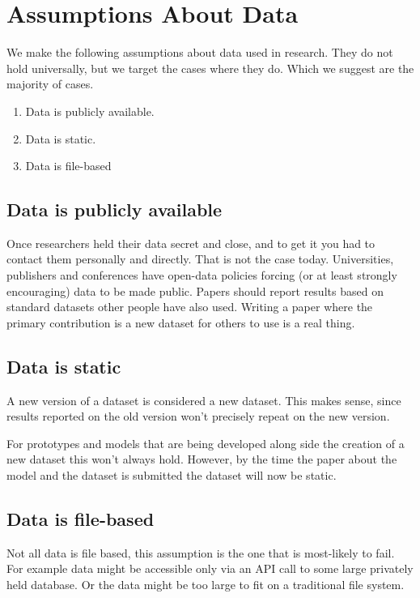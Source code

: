 \documentclass[]{article}
\begin{document}
\section{Assumptions About Data}
We make the following assumptions about data used in research.
They do not hold universally, but we target the cases where they do.
Which we suggest are the majority of cases.


\begin{enumerate}
	\item Data is publicly available.
	\item Data is static.
	\item Data is file-based
\end{enumerate}

\subsection{Data is publicly available}
Once researchers held their data secret and close, and to get it you had to contact them personally and directly.
That is not the case today.
Universities, publishers and conferences have open-data policies forcing (or at least strongly encouraging) data to be made public.
Papers should report results based on standard datasets other people have also used.
Writing a paper where the primary contribution is a new dataset for others to use is a real thing.


\subsection{Data is static}
A new version of a dataset is considered a new dataset.
This makes sense, since results reported on the old version won't precisely repeat on the new version.

For prototypes and models that are being developed along side the creation of a new dataset this won't always hold.
However, by the time the paper about the model and the dataset is submitted the dataset will now be static.

\subsection{Data is file-based}
Not all data is file based, this assumption is the one that is most-likely to fail.
For example data might be accessible only via an API call to some large privately held database.
Or the data might be too large to fit on a traditional file system.
\end{document}
